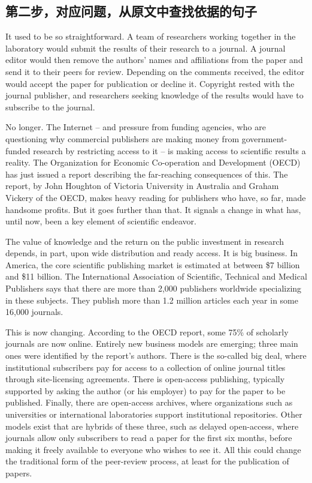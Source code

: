 \documentclass[a4paper]{ctexart}
\begin{document}
\subsection{第二步，对应问题，从原文中查找依据的句子}

It used to be so straightforward. A team of researchers working together in the laboratory would submit the results of their research to a journal. A journal editor would then remove the authors’ names and affiliations from the paper and send it to their peers for review. Depending on the comments received, the editor would accept the paper for publication or decline it. Copyright rested with the journal publisher, and researchers seeking knowledge of the results would have to subscribe to the journal.
\par
No longer. The Internet – and pressure from funding agencies, who are questioning why commercial publishers are making money from government-funded research by restricting access to it – is making access to scientific results a reality. The Organization for Economic Co-operation and Development (OECD) has just issued a report describing the far-reaching consequences of this. The report, by John Houghton of Victoria University in Australia and Graham Vickery of the OECD, makes heavy reading for publishers who have, so far, made handsome profits. But it goes further than that. It signals a change in what has, until now, been a key element of scientific endeavor.
\par
The value of knowledge and the return on the public investment in research depends, in part, upon wide distribution and ready access. It is big business. In America, the core scientific publishing market is estimated at between \$7 billion and \$11 billion. The International Association of Scientific, Technical and Medical Publishers says that there are more than 2,000 publishers worldwide specializing in these subjects. They publish more than 1.2 million articles each year in some 16,000 journals.
\par
This is now changing. According to the OECD report, some 75\% of scholarly journals are now online. Entirely new business models are emerging; three main ones were identified by the report’s authors. There is the so-called big deal, where institutional subscribers pay for access to a collection of online journal titles through site-licensing agreements. There is open-access publishing, typically supported by asking the author (or his employer) to pay for the paper to be published. Finally, there are open-access archives, where organizations such as universities or international laboratories support institutional repositories. Other models exist that are hybrids of these three, such as delayed open-access, where journals allow only subscribers to read a paper for the first six months, before making it freely available to everyone who wishes to see it. All this could change the traditional form of the peer-review process, at least for the publication of papers.
\\
\end{document}
